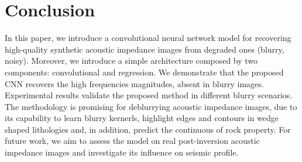 \documentclass[conference]{IEEEtran}
\begin{document}
\section{Conclusion}
In this paper, we introduce a convolutional neural network model for recovering high-quality
synthetic acoustic impedance images from degraded ones (blurry, noisy). Moreover,
we introduce a simple architecture composed by two components: convolutional and regression.
We demonstrate that the proposed CNN recovers the high frequencies magnitudes, absent in blurry images. Experimental results validate the proposed method in different blurry scenarios. The methodology is promising for deblurrying acoustic impedance images, due to its capability to learn blurry kernerls, highlight edges and contours in wedge shaped lithologies and, in addition, predict the continuous of rock property. For future work, we aim to assess the model on real post-inversion acoustic impedance images and investigate its influence on seismic profile.
\end{document}
